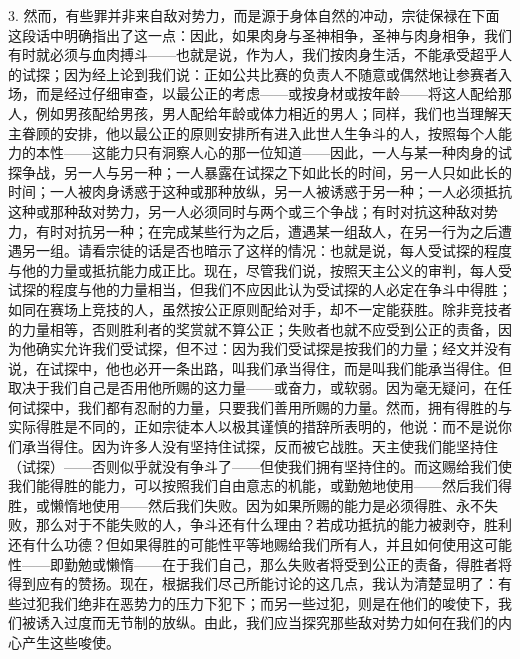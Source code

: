 3. 然而，有些罪并非来自敌对势力，而是源于身体自然的冲动，宗徒保禄在下面这段话中明确指出了这一点：因此，如果肉身与圣神相争，圣神与肉身相争，我们有时就必须与血肉搏斗——也就是说，作为人，我们按肉身生活，不能承受超乎人的试探；因为经上论到我们说：正如公共比赛的负责人不随意或偶然地让参赛者入场，而是经过仔细审查，以最公正的考虑——或按身材或按年龄——将这人配给那人，例如男孩配给男孩，男人配给年龄或体力相近的男人；同样，我们也当理解天主眷顾的安排，他以最公正的原则安排所有进入此世人生争斗的人，按照每个人能力的本性——这能力只有洞察人心的那一位知道——因此，一人与某一种肉身的试探争战，另一人与另一种；一人暴露在试探之下如此长的时间，另一人只如此长的时间；一人被肉身诱惑于这种或那种放纵，另一人被诱惑于另一种；一人必须抵抗这种或那种敌对势力，另一人必须同时与两个或三个争战；有时对抗这种敌对势力，有时对抗另一种；在完成某些行为之后，遭遇某一组敌人，在另一行为之后遭遇另一组。请看宗徒的话是否也暗示了这样的情况：也就是说，每人受试探的程度与他的力量或抵抗能力成正比。\newline{}现在，尽管我们说，按照天主公义的审判，每人受试探的程度与他的力量相当，但我们不应因此认为受试探的人必定在争斗中得胜；如同在赛场上竞技的人，虽然按公正原则配给对手，却不一定能获胜。除非竞技者的力量相等，否则胜利者的奖赏就不算公正；失败者也就不应受到公正的责备，因为他确实允许我们受试探，但不过：因为我们受试探是按我们的力量；经文并没有说，在试探中，他也必开一条出路，叫我们承当得住，而是叫我们能承当得住。但取决于我们自己是否用他所赐的这力量——或奋力，或软弱。因为毫无疑问，在任何试探中，我们都有忍耐的力量，只要我们善用所赐的力量。然而，拥有得胜的与实际得胜是不同的，正如宗徒本人以极其谨慎的措辞所表明的，他说：而不是说你们承当得住。因为许多人没有坚持住试探，反而被它战胜。天主使我们能坚持住（试探）——否则似乎就没有争斗了——但使我们拥有坚持住的。而这赐给我们使我们能得胜的能力，可以按照我们自由意志的机能，或勤勉地使用——然后我们得胜，或懒惰地使用——然后我们失败。因为如果所赐的能力是必须得胜、永不失败，那么对于不能失败的人，争斗还有什么理由？若成功抵抗的能力被剥夺，胜利还有什么功德？但如果得胜的可能性平等地赐给我们所有人，并且如何使用这可能性——即勤勉或懒惰——在于我们自己，那么失败者将受到公正的责备，得胜者将得到应有的赞扬。现在，根据我们尽己所能讨论的这几点，我认为清楚显明了：有些过犯我们绝非在恶势力的压力下犯下；而另一些过犯，则是在他们的唆使下，我们被诱入过度而无节制的放纵。由此，我们应当探究那些敌对势力如何在我们的内心产生这些唆使。\par

